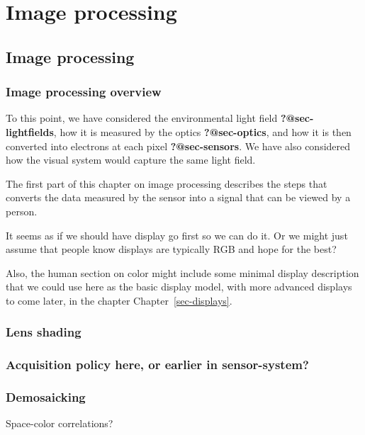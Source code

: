 \documentclass[
  letterpaper,
]{book}
\begin{document}
\part{Image processing}

\chapter{Image processing}\label{sec-imgprocessing}

\section{Image processing overview}\label{sec-imgprocessing-overview}

To this point, we have considered the environmental light field
\textbf{?@sec-lightfields}, how it is measured by the optics
\textbf{?@sec-optics}, and how it is then converted into electrons at
each pixel \textbf{?@sec-sensors}. We have also considered how the
visual system would capture the same light field.

The first part of this chapter on image processing describes the steps
that converts the data measured by the sensor into a signal that can be
viewed by a person.

It seems as if we should have display go first so we can do it. Or we
might just assume that people know displays are typically RGB and hope
for the best?

Also, the human section on color might include some minimal display
description that we could use here as the basic display model, with more
advanced displays to come later, in the chapter
Chapter~\ref{sec-displays}.

\section{Lens shading}\label{lens-shading}

\section{Acquisition policy here, or earlier in
sensor-system?}\label{acquisition-policy-here-or-earlier-in-sensor-system}

\section{Demosaicking}\label{demosaicking}

Space-color correlations?
\end{document}
